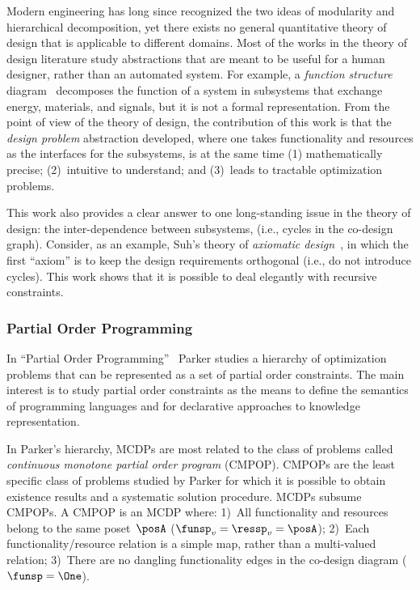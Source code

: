 Modern engineering has long since recognized the two ideas of modularity
and hierarchical decomposition, yet there exists no general quantitative
theory of design that is applicable to different domains. Most of
the works in the theory of design literature study abstractions that
are meant to be useful for a human designer, rather than an automated
system. For example, a \emph{function structure }diagram~\cite[p. 32]{pahl07}
decomposes the function of a system in subsystems that exchange energy,
materials, and signals, but it is not a formal representation. From
the point of view of the theory of design, the contribution of this
work is that the \emph{design problem }abstraction developed, where
one takes functionality and resources as the interfaces for the subsystems,
is at the same time (1) mathematically precise; (2)~intuitive to
understand; and (3)~leads to tractable optimization problems.

This work also provides a clear answer to one long-standing issue
in the theory of design: the inter-dependence between subsystems,
(i.e., cycles in the co-design graph). Consider, as an example, Suh's
theory of \emph{axiomatic design~}\cite{suh01}, in which the first
``axiom'' is to keep the design requirements orthogonal (i.e., do
not introduce cycles). This work shows that it is possible to deal
elegantly with recursive constraints.


\subsubsection{Partial Order Programming}

In ``Partial Order Programming''~\cite{parkerjr89partial} Parker
studies a hierarchy of optimization problems that can be represented
as a set of partial order constraints. The main interest is to study
partial order constraints as the means to define the semantics of
programming languages and for declarative approaches to knowledge
representation.

In Parker's hierarchy, MCDPs are most related to the class of problems
called \emph{continuous monotone partial order program} (CMPOP). CMPOPs
are the least specific class of problems studied by Parker for which
it is possible to obtain existence results and a systematic solution
procedure. MCDPs subsume CMPOPs. A CMPOP is an MCDP where: 1)~All
functionality and resources belong to the same poset~$\posA$ ($\funsp_{v}=\ressp_{v}=\posA$);
2)~Each functionality/resource relation is a simple map, rather than
a multi-valued relation; 3)~There are no dangling functionality edges
in the co-design diagram ($\funsp=\One$).

